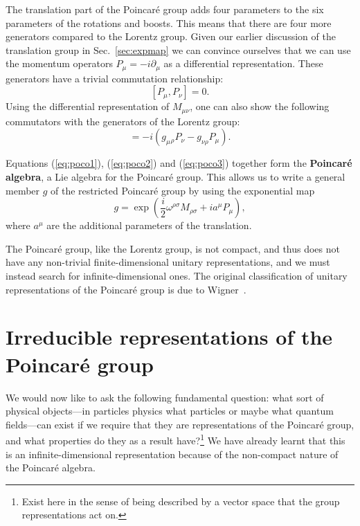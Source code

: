 \documentclass[notes.tex]{subfiles}
\begin{document}
The translation part of the Poincaré group adds four parameters to the six parameters of the rotations and boosts. This means that there are four more generators compared to the Lorentz group. Given our earlier discussion of the translation group in Sec.~\ref{sec:expmap} we can convince ourselves that we can use the momentum operators $P_\mu=-i\partial_\mu$ as a differential representation. These generators have a trivial commutation relationship:
\begin{equation}\label{eq:poco2}
[P_\mu, P_\nu] = 0.
\end{equation}
Using the differential representation of $M_{\mu\nu}$, one can also show the following commutators with the generators of the Lorentz group:
\begin{equation}
[M_{\mu\nu}, P_\rho] = -i(g_\mu{}_\rho P_\nu - g_{\nu \rho} P_\mu).
\label{eq:poco3}
\end{equation}

Equations (\ref{eq:poco1}), (\ref{eq:poco2}) and (\ref{eq:poco3}) together form the {\bf Poincaré algebra}, a Lie algebra for the Poincaré group. This allows us to write a general member $g$ of the restricted Poincaré group by using the exponential map 
\begin{equation}
g=\exp\left(\frac{i}{2}\omega^{\rho \sigma}M_{\rho \sigma}+ia^\mu P_\mu\right),
\label{eq:Poincare_exp_map}
\end{equation}
where $a^\mu$ are the additional parameters of the translation. 

The Poincaré group, like the Lorentz group, is not compact, and thus does not have any non-trivial finite-dimensional unitary representations, and we must instead search for infinite-dimensional ones. The original classification of unitary representations of the Poincaré group is due to Wigner~\cite{Wigners_classification}.



\section{Irreducible representations of the Poincaré group}
\label{sec:Poincare_irreps}
We would now like to ask the following fundamental question: what sort of physical objects---in particles physics what particles or maybe what quantum fields---can exist if we require that they are representations of the Poincaré group, and what properties do they as a result have?\footnote{Exist here in the sense of being described by a vector space that the group representations act on.} We have already learnt that this is an infinite-dimensional representation because of the non-compact nature of the Poincaré algebra.
\end{document}
